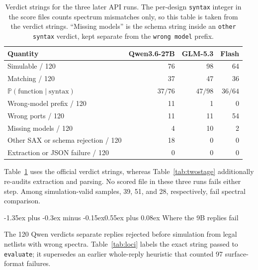 \documentclass[11pt]{article}
\makeatletter
\renewcommand\section{\@startsection{section}{1}{\z@}%
  {-1.35ex plus -0.3ex minus -0.15ex}{0.55ex plus 0.08ex}%
  {\normalfont\large\bfseries}}
\makeatother
\begin{document}
\begin{table}[H]
\caption{Verdict strings for the three later API runs.
The per-design \texttt{syntax} integer in the score files counts spectrum mismatches only, so this table is taken from the verdict strings.
``Missing models'' is the schema string inside an \texttt{other syntax} verdict, kept separate from the \texttt{wrong model} prefix.}
\label{tab:api}
\begin{center}
\begin{small}
\begin{tabular}{lrrr}
\toprule
Quantity & Qwen3.6-27B & GLM-5.3 & Flash \\
\midrule
Simulable / 120 & 76 & 98 & 64 \\
Matching / 120 & 37 & 47 & 36 \\
$\mathbb{P}(\text{function}\mid\text{syntax})$ & $37/76$ & $47/98$ & $36/64$ \\
Wrong-model prefix / 120 & 11 & 1 & 0 \\
Wrong ports / 120 & 11 & 11 & 54 \\
Missing models / 120 & 4 & 10 & 2 \\
Other SAX or schema rejection / 120 & 18 & 0 & 0 \\
Extraction or JSON failure / 120 & 0 & 0 & 0 \\
\bottomrule
\end{tabular}
\end{small}
\end{center}
\end{table}

Table~\ref{tab:api} uses the official verdict strings, whereas Table~\ref{tab:twostage} additionally re-audits extraction and parsing. No scored file in these three runs fails either step. Among simulation-valid samples, 39, 51, and 28, respectively, fail spectral comparison.

\section{Where the 9B replies fail}
\label{sec:loci}

The 120 Qwen verdicts separate replies rejected before simulation from legal netlists with wrong spectra. Table~\ref{tab:loci} labels the exact string passed to \texttt{evaluate}; it supersedes an earlier whole-reply heuristic that counted 97 surface-format failures.
\end{document}
